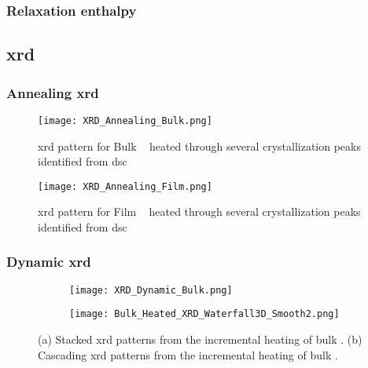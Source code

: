 \documentclass[a4paper,12pt,oneside]{article}%
\begin{document}
\subsubsection{Relaxation enthalpy}

\subsection{\acrshort{xrd}}
\subsubsection{Annealing \acrshort{xrd}}

\begin{figure}[b]
	\centering
	\texttt{[image: XRD\_Annealing\_Bulk.png]}
	\caption[Table of contents Capition]{\acrshort{xrd} pattern for Bulk \MgZnCa~ heated through several crystallization peaks identified from \acrshort{dsc}}
	\label{fig:XRD_Annealing_Bulk}
\end{figure}

\begin{figure}[b]
	\centering
	\texttt{[image: XRD\_Annealing\_Film.png]}
	\caption[Table of contents Capition]{\acrshort{xrd} pattern for Film \MgZnCa~ heated through several crystallization peaks identified from \acrshort{dsc}}
	\label{fig:XRD_Annealing_Film}
\end{figure}

\subsubsection{Dynamic \acrshort{xrd}}

\begin{figure}[b]
	\centering
	\begin{subfigure}[htbp]{0.75\textwidth}
		\texttt{[image: XRD\_Dynamic\_Bulk.png]}
		\caption{}
		\label{fig:XRD_Dynamic_FullStack_Bulk}
	\end{subfigure}
	\begin{subfigure}[htbp]{0.75\textwidth}
		\texttt{[image: Bulk\_Heated\_XRD\_Waterfall3D\_Smooth2.png]}
		\caption{}
		\label{fig:XRD_Dynamic_WaterFall_Bulk}
	\end{subfigure}
	\caption{(a) Stacked \gls{xrd} patterns from the incremental heating of bulk \MgZnCa. (b) Cascading \gls{xrd} patterns from the incremental heating of bulk \MgZnCa. }%
	\label{fig:XRD_Dynamic_Bulk}
\end{figure}
\end{document}
